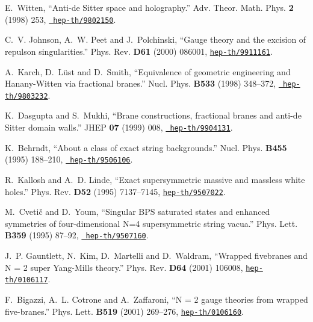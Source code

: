 \documentclass[a4paper,11pt]{article}
\begin{document}
\begin{thebibliography}{10}
E.~Witten, ``{Anti-de Sitter} space and holography.'' Adv. Theor. Math. Phys.
  {\bf 2} (1998) 253, \href{http://xxx.lanl.gov/abs/hep-th/9802150}{{\tt
  hep-th/9802150}}. %

C.~V. Johnson, A.~W. Peet and J.~Polchinski, ``Gauge theory and the excision of
  repulson singularities.'' Phys. Rev. {\bf D61} (2000) 086001,
  \href{http://xxx.lanl.gov/abs/hep-th/9911161}{{\tt hep-th/9911161}}.

A.~Karch, D.~L{\"u}st and D.~Smith, ``Equivalence of geometric engineering and
  Hanany-Witten via fractional branes.'' Nucl. Phys. {\bf B533} (1998)
  348--372, \href{http://xxx.lanl.gov/abs/hep-th/9803232}{{\tt
  hep-th/9803232}}. %

K.~Dasgupta and S.~Mukhi, ``Brane constructions, fractional branes and anti-de
  Sitter domain walls.'' JHEP {\bf 07} (1999) 008,
  \href{http://xxx.lanl.gov/abs/http://arXiv.org/abs/hep-th/9904131}{{\tt
  hep-th/9904131}}. %

K.~Behrndt, ``About a class of exact string backgrounds.'' Nucl. Phys. {\bf
  B455} (1995) 188--210, \href{http://xxx.lanl.gov/abs/hep-th/9506106}{{\tt
  hep-th/9506106}}. %

R.~Kallosh and A.~D. Linde, ``Exact supersymmetric massive and massless white
  holes.'' Phys. Rev. {\bf D52} (1995) 7137--7145,
  \href{http://xxx.lanl.gov/abs/hep-th/9507022}{{\tt hep-th/9507022}}.

M.~Cveti\v{c} and D.~Youm, ``Singular BPS saturated states and enhanced
  symmetries of four-dimensional N=4 supersymmetric string vacua.'' Phys. Lett.
  {\bf B359} (1995) 87--92, \href{http://xxx.lanl.gov/abs/hep-th/9507160}{{\tt
  hep-th/9507160}}. %

J.~P. Gauntlett, N.~Kim, D.~Martelli and D.~Waldram, ``Wrapped fivebranes and N
  = 2 super {Yang-Mills} theory.'' Phys. Rev. {\bf D64} (2001) 106008,
  \href{http://xxx.lanl.gov/abs/hep-th/0106117}{{\tt hep-th/0106117}}.

F.~Bigazzi, A.~L. Cotrone and A.~Zaffaroni, ``N = 2 gauge theories from wrapped
  five-branes.'' Phys. Lett. {\bf B519} (2001) 269--276,
  \href{http://xxx.lanl.gov/abs/hep-th/0106160}{{\tt hep-th/0106160}}.


\end{thebibliography}
\end{document}
